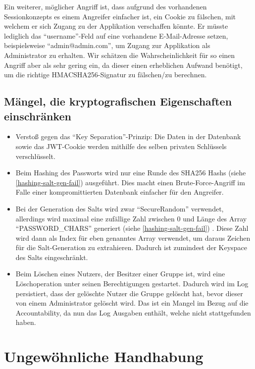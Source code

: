 \documentclass[12pt,DIV14,BCOR10mm,a4paper,parskip=half-,headsepline,headinclude,english,ngerman,bibliography=totocnumbered]{scrreprt}
\begin{document}
Ein weiterer, möglicher Angriff ist, dass aufgrund des vorhandenen Sessionkonzepts es einem Angreifer einfacher ist, ein Cookie zu fälschen, mit welchem er sich Zugang zu der Applikation verschaffen könnte.
Er müsste lediglich das \enquote{username}-Feld auf eine vorhandene E-Mail-Adresse setzen, beispielsweise \enquote{admin@admin.com}, um Zugang zur Applikation als Administrator zu erhalten.
Wir schätzen die Wahrscheinlichkeit für so einen Angriff aber als sehr gering ein, da dieser einen erheblichen Aufwand benötigt, um die richtige HMACSHA256-Signatur zu fälschen/zu berechnen.

\section{Mängel, die kryptografischen Eigenschaften einschränken}

\begin{itemize}
  \item Verstoß gegen das \enquote{Key Separation}-Prinzip: Die Daten in der Datenbank sowie das JWT-Cookie werden mithilfe des selben privaten Schlüssels verschlüsselt.
  \item Beim Hashing des Passworts wird nur eine Runde des SHA256 Hashs (siehe \ref{hashing-salt-gen-fail}) ausgeführt. Dies macht einen Brute-Force-Angriff im Falle einer kompromittierten Datenbank einfacher für den Angreifer.
  \item Bei der Generation des Salts wird zwar \enquote{SecureRandom} verwendet, allerdings wird maximal eine zufällige Zahl zwischen 0 und Länge des Array \enquote{PASSWORD\-\_CHARS} generiert (siehe \ref{hashing-salt-gen-fail}) . Diese Zahl wird dann als Index für eben genanntes Array verwendet, um daraus Zeichen für die Salt-Generation zu extrahieren. Dadurch ist zumindest der Keyspace des Salts eingeschränkt.
  \item Beim Löschen eines Nutzers, der Besitzer einer Gruppe ist, wird eine Löschoperation unter seinen Berechtigungen gestartet. Dadurch wird im Log persistiert, dass der gelöschte Nutzer die Gruppe gelöscht hat, bevor dieser von einem Administrator gelöscht wird. Das ist ein Mangel im Bezug auf die Accountability, da nun das Log Ausgaben enthält, welche nicht stattgefunden haben.
\end{itemize}

\chapter{Ungewöhnliche Handhabung}
\end{document}
